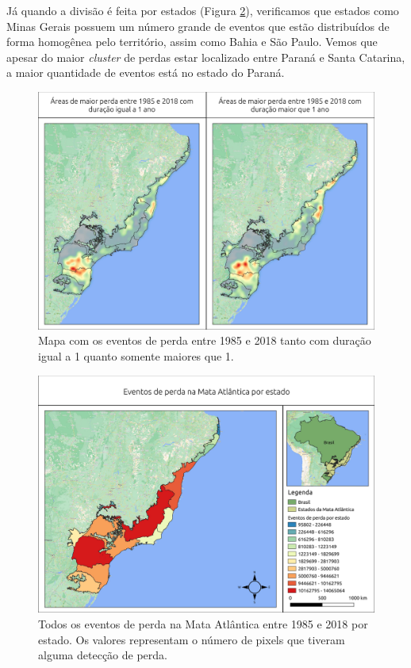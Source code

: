 Já quando a divisão é feita por estados (Figura \ref{fig:estados_loss_masked85_maskedgain}), verificamos que estados como Minas Gerais possuem um número grande de eventos que estão distribuídos de forma homogênea pelo território, assim como Bahia e São Paulo. Vemos que apesar do maior \textit{cluster} de perdas estar localizado entre Paraná e Santa Catarina, a maior quantidade de eventos está no estado do Paraná. 

\begin{figure}[H]
    \centering
    \includegraphics[scale=.5]{images/heatmap_loss_eq1_neq1.pdf}
    \caption{Mapa com os eventos de perda entre 1985 e 2018 tanto com duração igual a 1 quanto somente maiores que 1.}
    \label{fig:heat_loss_eq1_neq1}
\end{figure}

\begin{figure}[H]
    \centering
    \includegraphics[scale=.5]{images/estados_loss_masked85_maskedGain.pdf}
    \caption{Todos os eventos de perda na Mata Atlântica entre 1985 e 2018 por estado. Os valores representam o número de pixels que tiveram alguma detecção de perda.}
    \label{fig:estados_loss_masked85_maskedgain}
\end{figure}

